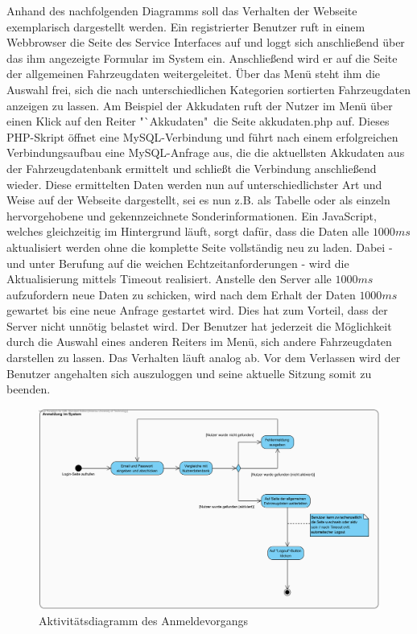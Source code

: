 \documentclass[fontsize = 12pt, paper = a4]{scrreprt}
\begin{document}
Anhand des nachfolgenden Diagramms soll das Verhalten der Webseite exemplarisch dargestellt werden. Ein registrierter Benutzer ruft in einem Webbrowser die Seite des Service Interfaces auf und loggt sich anschließend über das ihm angezeigte Formular im System ein. Anschließend wird er auf die Seite der allgemeinen Fahrzeugdaten weitergeleitet. Über das Menü steht ihm die Auswahl frei, sich die nach unterschiedlichen Kategorien sortierten Fahrzeugdaten anzeigen zu lassen. Am Beispiel der Akkudaten ruft der Nutzer im Menü über einen Klick auf den Reiter "`Akkudaten"\ die Seite akkudaten.php auf. Dieses PHP-Skript öffnet eine MySQL-Verbindung und führt nach einem erfolgreichen Verbindungsaufbau eine MySQL-Anfrage aus, die die aktuellsten Akkudaten aus der Fahrzeugdatenbank ermittelt und schließt die Verbindung anschließend wieder. Diese ermittelten Daten werden nun auf unterschiedlichster Art und Weise auf der Webseite dargestellt, sei es nun z.B. als Tabelle oder als einzeln hervorgehobene und gekennzeichnete Sonderinformationen.
Ein JavaScript, welches gleichzeitig im Hintergrund läuft, sorgt dafür, dass die Daten alle $1000 ms$ aktualisiert werden ohne die komplette Seite vollständig neu zu laden. Dabei - und unter Berufung auf die weichen Echtzeitanforderungen - wird die Aktualisierung mittels Timeout realisiert. Anstelle den Server alle $1000 ms$ aufzufordern neue Daten zu schicken, wird nach dem Erhalt der Daten $1000 ms$ gewartet bis eine neue Anfrage gestartet wird. Dies hat zum Vorteil, dass der Server nicht unnötig belastet wird.
Der Benutzer hat jederzeit die Möglichkeit durch die Auswahl eines anderen Reiters im Menü, sich andere Fahrzeugdaten darstellen zu lassen. Das Verhalten läuft analog ab. Vor dem Verlassen wird der Benutzer angehalten sich auszuloggen und seine aktuelle Sitzung somit zu beenden. \\



\begin{figure}[h]
\centering
\includegraphics[scale = 0.6]{anmeldungsvorgang}
\caption[Aktivitätsdiagramm Anmeldevorgang]{Aktivitätsdiagramm des Anmeldevorgangs}
\label{Anmeldevorgang}
\end{figure}
\end{document}
